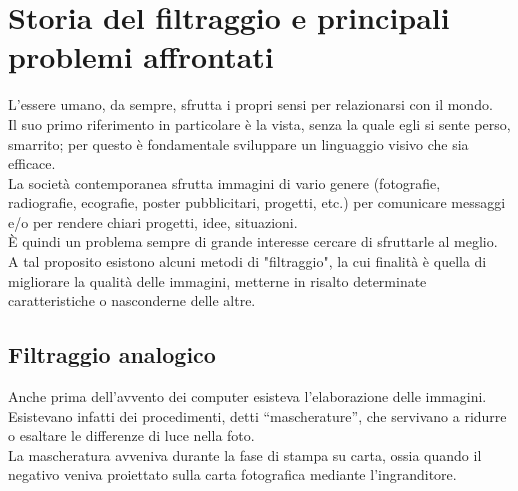 \chapter{Storia del filtraggio e principali problemi affrontati}

L'essere umano, da sempre, sfrutta i propri sensi per relazionarsi con il mondo.  \\Il suo primo riferimento in particolare è la vista, senza la quale egli si sente perso, smarrito; per questo è fondamentale sviluppare un linguaggio  visivo che sia efficace. \\ La società contemporanea sfrutta immagini di vario genere (fotografie, radiografie, ecografie, poster pubblicitari, progetti, etc.) per comunicare messaggi e/o per rendere chiari progetti, idee, situazioni.\\
\`E quindi un problema sempre di grande interesse cercare di sfruttarle al meglio. A tal proposito esistono alcuni metodi di "filtraggio", la cui finalità è quella di migliorare la qualità delle immagini, metterne in risalto determinate caratteristiche o nasconderne delle altre.








\section{Filtraggio analogico}
Anche prima dell'avvento dei computer esisteva l'elaborazione delle immagini. Esistevano infatti dei procedimenti, detti “mascherature”, che servivano a ridurre o esaltare le differenze di luce nella foto.\\
La mascheratura avveniva durante la fase di stampa su carta, ossia quando il negativo veniva proiettato sulla carta fotografica mediante l’ingranditore.



